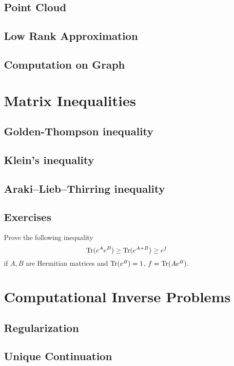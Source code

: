 \section{Point Cloud}



\section{Low Rank Approximation}


\section{Computation on Graph}

\chapter{Matrix Inequalities}
\section{Golden-Thompson inequality}
\section{Klein's inequality}
\section{Araki–Lieb–Thirring inequality}
\section{Exercises}
\begin{problem}
Prove the following inequality 
    \begin{equation*}
        {\textrm{Tr}}(e^A e^B) \ge {\textrm{Tr}}(e^{A + B}) \ge e^f
    \end{equation*}
    if $A, B$ are Hermitian matrices and ${\textrm{Tr}}(e^B) = 1$, $f = {\textrm{Tr}}(A e^B)$.
\end{problem}
\newpage
\chapter{Computational Inverse Problems}
\section{Regularization}
\section{Unique Continuation}